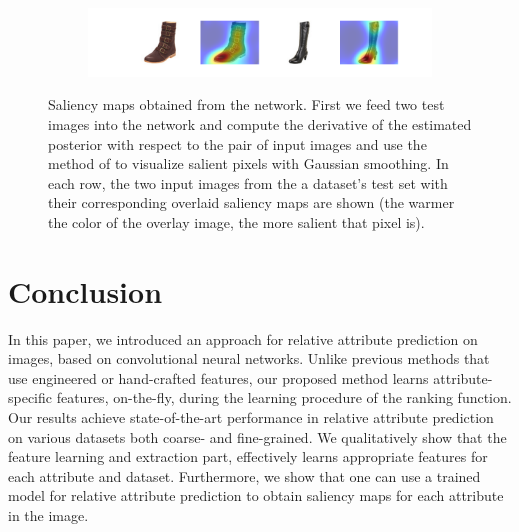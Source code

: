 \documentclass[runningheads]{llncs}
\begin{document}
\begin{figure}
    \begin{subfigure}
        \centering
        \includegraphics[width=0.8\linewidth, trim={0 1cm 0 0},clip]{pointy-1.png}
        \footnotesize
    \end{subfigure}
    
    \caption{Saliency maps obtained from the network. First we feed two test images into the network and compute the derivative of the estimated posterior with respect to the pair of input images and use the method of \cite{saliency} to visualize salient pixels with Gaussian smoothing. In each row, the two input images from the a dataset's test set with their corresponding overlaid saliency maps are shown (the warmer the color of the overlay image, the more salient that pixel is).}
    \label{fig.5}
\end{figure}



\section{Conclusion}
\label{sec.5}

In this paper, we introduced an approach for relative attribute prediction on images, based on convolutional neural networks. Unlike previous methods that use engineered or hand-crafted features, our proposed method learns attribute-specific features, on-the-fly, during the learning procedure of the ranking function. Our results achieve state-of-the-art performance in relative attribute prediction on various datasets both coarse- and fine-grained.
We qualitatively show that the feature learning and extraction part, effectively learns appropriate features for each attribute and dataset.
Furthermore, we show that one can use a trained model for relative attribute prediction to obtain saliency maps for each attribute in the image.
\end{document}
